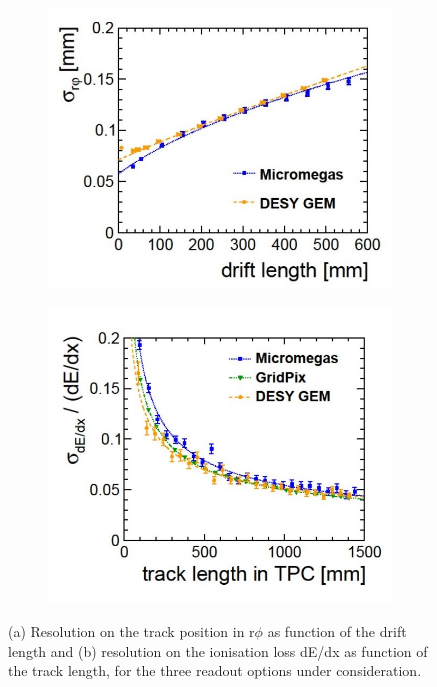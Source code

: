 \begin{figure}[t!]
\centering
\begin{subfigure}{0.48\textwidth}
\includegraphics[width=1.0\hsize]{Detector/fig/TPC_performances_resolution.jpg}
\caption{}
\end{subfigure}
\begin{subfigure}{0.48\textwidth}
\includegraphics[width=1.0\hsize]{Detector/fig/TPC_performances_dedx.jpg}
\caption{}
\end{subfigure}
\caption{(a) Resolution on the track position in r$\phi$ as function of the drift length and (b) resolution on the ionisation loss dE/dx as function of the track length, for the three readout options under consideration.}
\label{fig:det:TPC_performances}
\end{figure}

